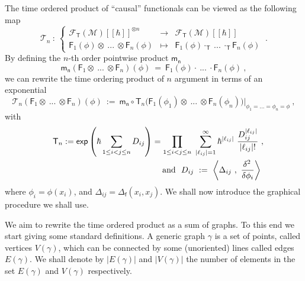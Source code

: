 \documentclass[11pt]{book}
\renewcommand{\exp}{\mathsf{exp}}
\newcommand{\abs}[1]{\left|#1\right|}
\newcommand{\sm}[1]{\left\langle#1\right\rangle}
\newcommand{\Fcal}{\mathcal{F}}
\newcommand{\Mcal}{\mathcal{M}}
\newcommand{\Tcal}{\mathcal{T}}
\newcommand{\Fsf}{\mathsf{F}}
\newcommand{\Tsf}{\mathsf{T}}
\newcommand{\fsf}{\mathsf{f}}
\newcommand{\msf}{\mathsf{m}}
\newcommand{\nsf}{\mathsf{n}}
\theoremstyle{break}
\begin{document}
The  time ordered product of ``causal'' functionals can be viewed  as the following map
%
\begin{equation}
\Tcal_n \ : \ 
\left\{
\begin{array}{lcl}
\Fcal_\Tsf(\Mcal)[[\hbar]]^{\otimes n} & \to & \Fcal_\Tsf(\Mcal)[[\hbar]] \\
\Fsf_1(\phi) \otimes \ ... \ \otimes \Fsf_n(\phi) & \mapsto & \Fsf_1(\phi) \cdot_{\Tsf} \ ... \ \cdot_{\Tsf} \Fsf_n(\phi)
\end{array}
\right. \ .
\label{eq:time_ordered_op}
\end{equation}
% 
By defining the $n$-th order pointwise product $\msf_\nsf$
%
\begin{equation*}
\msf_\nsf \left( \Fsf_1 \otimes \ ... \ \otimes \Fsf_n \right)(\phi) \ = \ \Fsf_1(\phi) \cdot \ ... \ \cdot \Fsf_n(\phi) \ ,
\end{equation*}
%
we can rewrite the time ordering product of $n$ argument in terms of an exponential
%
\begin{equation*}
\Tcal_n (\Fsf_1 \otimes \ ... \ \otimes \Fsf_n)(\phi) \ := \ \msf_\nsf \circ \Tsf_n \bigg( \Fsf_1(\phi_1) \otimes \ ... \ \otimes \Fsf_n(\phi_n) \bigg) \bigg|_{\phi_1 = ... = \phi_n = \phi} \ ,
\end{equation*}
%
with 
%
\begin{eqnarray*}
&&\Tsf_n := \exp\left(\hbar \sum_{1 \leq i < j \leq n} D_{ij}\right) =
\prod_{1 \leq i < j \leq n} \ \sum_{\abs{\ell_{ij}}=1}^\infty \hbar^{\abs{\ell_{ij}}} \ \frac{D_{ij}^{\abs{\ell_{ij}}}}{\abs{\ell_{ij}} !} \ , \\
&& \mbox{ and } \ D_{ij} \ := \ \sm{\Delta_{ij} \ , \ \frac{\delta^2 \hfil}{\delta \phi_i} } \ 
\end{eqnarray*}
%
where $\phi_i = \phi(x_i)$, and $\Delta_{ij}=\Delta_\fsf(x_i,x_j)$. We shall now introduce the graphical procedure we shall use. 


\bigskip


We aim to rewrite the time ordered product as a sum of graphs. To this end we start giving some standard definitions. A generic graph $\gamma$ is a set of points, called vertices $V(\gamma)$, which can be connected by some (unoriented) lines called edges $E(\gamma)$. We shall denote by $\abs{E(\gamma)}$ and $\abs{V(\gamma)}$ the number of elements in the set $E(\gamma)$ and $V(\gamma)$ respectively. 
\end{document}
